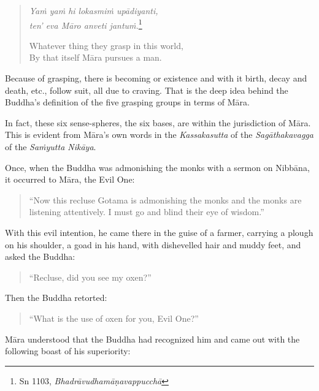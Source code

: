 \begin{quote}
\emph{Yaṁ yaṁ hi lokasmiṁ upādiyanti,}\\
\emph{ten' eva Māro anveti jantuṁ.}\footnote{Sn 1103, \emph{Bhadrāvudhamāṇavappucchā}}

Whatever thing they grasp in this world,\\
By that itself Māra pursues a man.
\end{quote}

Because of grasping, there is becoming or existence and with it birth, decay and death, etc., follow suit, all due to craving. That is the deep idea behind the Buddha's definition of the five grasping groups in terms of Māra.

In fact, these six sense-spheres, the six bases, are within the jurisdiction of Māra. This is evident from Māra's own words in the \emph{Kassakasutta} of the \emph{Sagāthakavagga} of the \emph{Saṁyutta Nikāya}.

Once, when the Buddha was admonishing the monks with a sermon on Nibbāna, it occurred to Māra, the Evil One:

\begin{quote}
``Now this recluse Gotama is admonishing the monks and the monks are listening attentively. I must go and blind their eye of wisdom.''
\end{quote}

With this evil intention, he came there in the guise of a farmer, carrying a plough on his shoulder, a goad in his hand, with dishevelled hair and muddy feet, and asked the Buddha:

\begin{quote}
``Recluse, did you see my oxen?''
\end{quote}

Then the Buddha retorted:

\begin{quote}
``What is the use of oxen for you, Evil One?''
\end{quote}

Māra understood that the Buddha had recognized him and came out with the following boast of his superiority:

